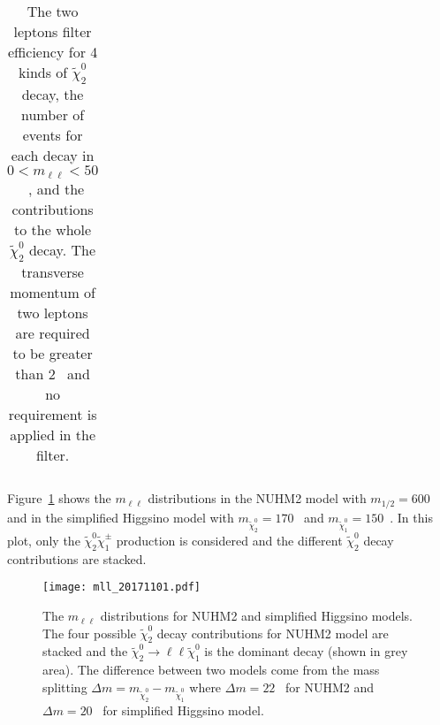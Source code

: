 \begin{table}[htb]
\begin{center}
{\begin{tabular}{lccccc}
                \hline
                \hline
            \end{tabular}
        }
    \end{center}
    \caption{The two leptons filter efficiency for 4 kinds of $\widetilde{\chi}^{0}_{2}$ decay, the number of events for each decay in $0 < m_{\ell\ell} < 50$~{\GeV}, and the contributions to the whole $\tilde{\chi}^{0}_{2}$ decay.
    The transverse momentum of two leptons are required to be greater than 2~{\GeV} and no \met requirement is applied in the filter.}
    \label{tab:data_nuhm2_n2_decay_efficiency_and_percentage}
\end{table}%

Figure~\ref{fig:data_mll_distribution} shows the $m_{\ell \ell}$ distributions in the NUHM2 model with $m_{1/2} = 600$~{\GeV} and in the simplified Higgsino model with $m_{\widetilde{\chi}^{0}_{2}} = 170$~{\GeV} and $m_{\widetilde{\chi}^{0}_{1}} = 150$~{\GeV}.
In this plot, only the $\widetilde{\chi}^{0}_{2} \widetilde{\chi}^{\pm}_{1}$ production is considered and the different $\widetilde{\chi}^{0}_{2}$ decay contributions are stacked.

\begin{figure}[htb]
    \begin{center}
        \texttt{[image: mll\_20171101.pdf]}
        \caption{The $m_{\ell \ell}$ distributions for NUHM2 and simplified Higgsino models.
        The four possible $\widetilde{\chi}^{0}_{2}$ decay contributions for NUHM2 model are stacked and the $\widetilde{\chi}^{0}_{2} \to \ell \ell \widetilde{\chi}^{0}_{1}$ is the dominant decay (shown in grey area).
        The difference between two models come from the mass splitting $\Delta m = m_{\widetilde{\chi}^{0}_{2}} - m_{\widetilde{\chi}^{0}_{1}}$ where $\Delta m = 22$~{\GeV} for NUHM2 and $\Delta m = 20$~{\GeV} for simplified Higgsino model.}
        \label{fig:data_mll_distribution}
    \end{center}
\end{figure}


